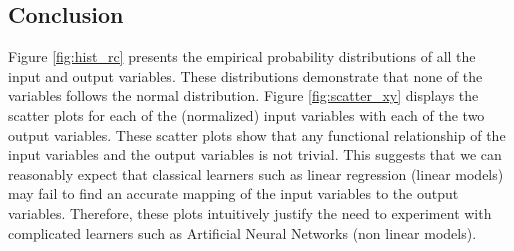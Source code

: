   \subsection{Conclusion}
  Figure \ref{fig:hist_rc} presents the empirical probability distributions of all the input and output variables. These distributions demonstrate that none of the variables follows the normal distribution. Figure \ref{fig:scatter_xy} displays the scatter plots for each of the (normalized) input variables with each of the two output variables. These scatter plots show that any functional relationship of the input variables and the output variables is not trivial. This suggests that we can reasonably expect that classical learners such as linear regression (linear models) may fail to find an accurate mapping of the input variables to the output variables. Therefore, these plots intuitively justify the need to experiment with complicated learners such as Artificial Neural Networks (non linear models).
